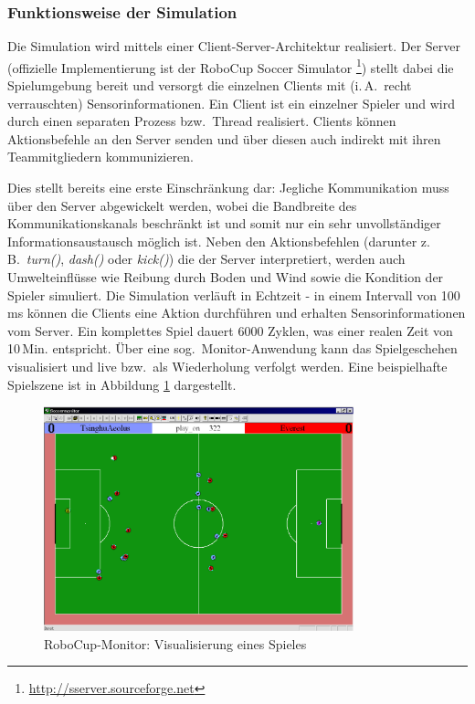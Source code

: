 \subsubsection{Funktionsweise der Simulation}
Die Simulation wird mittels einer Client-Server-Architektur realisiert. Der 
Server (offizielle Implementierung ist der \glq{}RoboCup Soccer Simulator\grq{} 
\footnote{\url{http://sserver.sourceforge.net}}) stellt dabei die Spielumgebung 
bereit und versorgt die einzelnen Clients mit (i.\,A.\ recht verrauschten) 
Sensorinformationen. Ein Client ist ein einzelner Spieler und wird durch einen 
separaten Prozess bzw.\ Thread realisiert. Clients können Aktionsbefehle an den 
Server senden und über diesen auch indirekt mit ihren Teammitgliedern 
kommunizieren.

Dies stellt bereits eine erste Einschränkung dar: Jegliche Kommunikation muss 
über den Server abgewickelt werden, wobei die Bandbreite des 
Kommunikationskanals beschränkt ist und somit nur ein sehr unvollständiger 
Informationsaustausch möglich ist.  Neben den Aktionsbefehlen (darunter z.\,B.\ 
\textsl{turn()}, \textsl{dash()} oder \textsl{kick()}) die der Server 
interpretiert, werden auch Umwelteinflüsse wie Reibung durch Boden und Wind 
sowie die Kondition der Spieler simuliert.
Die Simulation verläuft in Echtzeit - in einem Intervall von 100\,ms können die 
Clients eine Aktion durchführen und erhalten Sensorinformationen vom Server. 
Ein komplettes Spiel dauert 6000 Zyklen, was einer realen Zeit von 10\,Min. 
entspricht. Über eine sog.\ Monitor-Anwendung kann das Spielgeschehen 
visualisiert und live bzw.\ als Wiederholung verfolgt werden. Eine 
beispielhafte Spielszene ist in Abbildung \ref{fig:robocup-simulation-monitor} 
dargestellt.

\begin{figure}
  \centering
  \includegraphics[width=0.80\textwidth]{../images/rcssmonitor_classic}
  \caption{RoboCup-Monitor: Visualisierung eines Spieles}
  \label{fig:robocup-simulation-monitor}
\end{figure}

